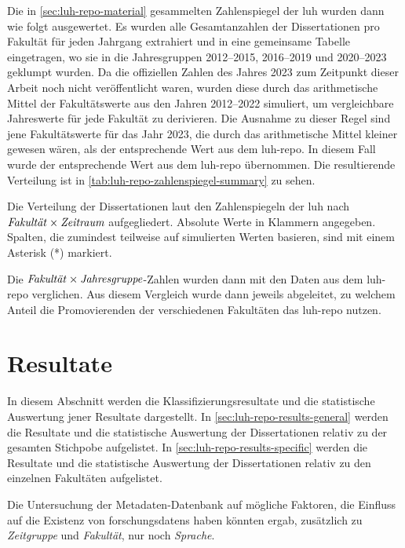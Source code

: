 Die in \cref{sec:luh-repo-material} gesammelten Zahlenspiegel der \gls{luh} wurden dann wie folgt ausgewertet.
Es wurden alle Gesamtanzahlen der Dissertationen pro Fakultät für jeden Jahrgang extrahiert und in eine gemeinsame Tabelle eingetragen, wo sie in die Jahresgruppen 2012--2015, 2016--2019 und 2020--2023 geklumpt wurden.
Da die offiziellen Zahlen des Jahres 2023 zum Zeitpunkt dieser Arbeit noch nicht veröffentlicht waren, wurden diese durch das arithmetische Mittel der Fakultätswerte aus den Jahren 2012--2022 simuliert, um vergleichbare Jahreswerte für jede Fakultät zu derivieren.
Die Ausnahme zu dieser Regel sind jene Fakultätswerte für das Jahr 2023, die durch das arithmetische Mittel kleiner gewesen wären, als der entsprechende Wert aus dem \gls{luh-repo}.
In diesem Fall wurde der entsprechende Wert aus dem \gls{luh-repo} übernommen.
Die resultierende Verteilung ist in \cref{tab:luh-repo-zahlenspiegel-summary} zu sehen.
\begin{table}[!htbp]
	\caption{Die Verteilung der Dissertationen laut den Zahlenspiegeln der \gls{luh} nach $\text{\textit{Fakultät}}\times\text{\textit{Zeitraum}}$ aufgegliedert.
    Absolute Werte in Klammern angegeben.
    Spalten, die zumindest teilweise auf simulierten Werten basieren, sind mit einem Asterisk (*) markiert.}
    
	\label{tab:luh-repo-zahlenspiegel-summary}
\end{table}
Die $\text{\textit{Fakultät}}\times\text{\textit{Jahresgruppe}}$-Zahlen wurden dann mit den Daten aus dem \gls{luh-repo} verglichen.
Aus diesem Vergleich wurde dann jeweils abgeleitet, zu welchem Anteil die Promovierenden der verschiedenen Fakultäten das \gls{luh-repo} nutzen.

\section{Resultate}\label{sec:luh-repo-results}
In diesem Abschnitt werden die Klassifizierungsresultate und die statistische Auswertung jener Resultate dargestellt.
In \cref{sec:luh-repo-results-general} werden die Resultate und die statistische Auswertung der Dissertationen relativ zu der gesamten Stichpobe aufgelistet.
In \cref{sec:luh-repo-results-specific} werden die Resultate und die statistische Auswertung der Dissertationen relativ zu den einzelnen Fakultäten aufgelistet.

Die Untersuchung der Metadaten-Datenbank auf mögliche Faktoren, die Einfluss auf die Existenz von \glspl{forschungsdaten} haben könnten ergab, zusätzlich zu \textit{Zeitgruppe} und \textit{Fakultät}, nur noch \textit{Sprache}.

